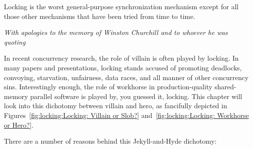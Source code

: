 

\epigraph{Locking is the worst general-purpose synchronization mechanism
	  except for all those other mechanisms that
	  have been tried from time to time.}{\emph{With apologies
	  to the memory of Winston Churchill and to whoever he was
	  quoting}}

In recent concurrency research, the role of villain is often played
by locking.
In many papers and presentations,
locking stands accused of promoting deadlocks, convoying, starvation,
unfairness, data races, and all manner of other concurrency sins.
Interestingly enough, the role of workhorse in production-quality
shared-memory parallel software is played by, you guessed it, locking.
This chapter will look into this dichotomy between villain and
hero, as fancifully depicted in
Figures~\ref{fig:locking:Locking: Villain or Slob?}
and~\ref{fig:locking:Locking: Workhorse or Hero?}.

There are a number of reasons behind this Jekyll-and-Hyde dichotomy:


